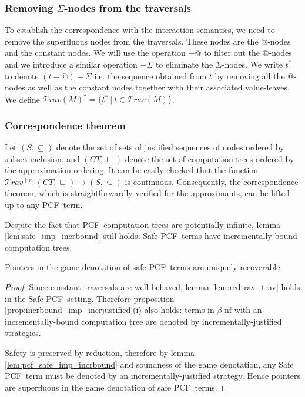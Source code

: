 \documentclass{llncs}
\newcommand\travset{\mathcal{T}rav}
\newcommand\pcf{\textsf{PCF}}
\begin{document}
\subsubsection{Removing $\Sigma$-nodes from the traversals}

To establish the correspondence with the interaction semantics, we
need to remove the superfluous nodes from the traversals. These
nodes are the @-nodes and the constant nodes. We will use the
operation $-@$ to filter out
the @-nodes and we introduce a similar operation $-\Sigma$ to
eliminate the $\Sigma$-nodes.
We write $t^*$ to denote $(t-@)-\Sigma$ i.e. the
sequence obtained from $t$ by removing all the @-nodes as well as
the constant nodes together with their associated value-leaves. We
define $\travset(M)^{*} = \{ t^* \ | \  t \in \travset(M) \}$.

\subsubsection{Correspondence theorem}
Let $(S,\subseteq)$ denote the set of sets of justified sequences of nodes ordered by subset inclusion.
and $(CT,\sqsubseteq)$ denote the set of computation trees ordered by the approximation ordering. It can be easily checked that the function 
$\travset^{\upharpoonright r} : (CT,\sqsubseteq) \rightarrow (S,\subseteq)$ is continuous. Consequently, the correspondence theorem,
which is straightforwardly verified for the approximants, can be lifted up to any \pcf\ term.

Despite the fact that \pcf\ computation trees are potentially infinite, 
lemma \ref{lem:safe_imp_incrbound} still holds: Safe \pcf\ terms have incrementally-bound computation trees.

\begin{theorem}[Pointers are superfluous for Safe \pcf]
Pointers in the game denotation of safe \pcf\ terms are uniquely
recoverable.
\end{theorem}
\begin{proof}
Since constant traversals are well-behaved, lemma \ref{lem:redtrav_trav} holds
in the Safe \pcf\ setting. Therefore proposition
\ref{prop:incrbound_imp_incrjustified}(i) also holds: terms in
$\beta$-nf with an incrementally-bound computation tree are denoted
by incrementally-justified strategies.

Safety is preserved by reduction, therefore by lemma
\ref{lem:pcf_safe_imp_incrbound} and soundness of the game
denotation, any Safe \pcf\ term must be denoted by an
incrementally-justified strategy.
Hence pointers are superfluous in the game denotation of safe \pcf\
terms.
\end{proof}
\end{document}
